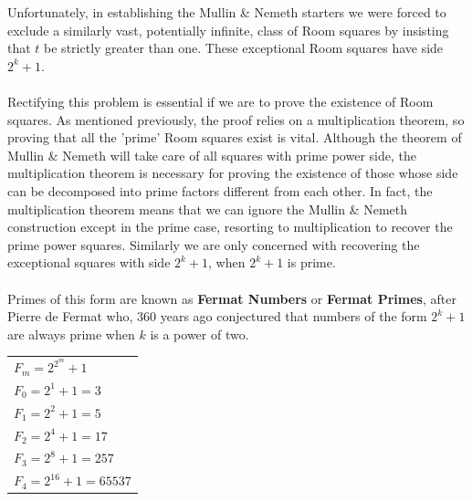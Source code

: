 \documentclass[
  12pt,
  a4paper]{book}
\begin{document}
Unfortunately, in establishing the Mullin \& Nemeth starters we were
forced to exclude a similarly vast, potentially infinite, class of Room
squares by insisting that \(t\) be strictly greater than one. These
exceptional Room squares have side \(2^k+1\).\\
~\\
Rectifying this problem is essential if we are to prove the existence of
Room squares. As mentioned previously, the proof relies on a
multiplication theorem, so proving that all the 'prime' Room squares
exist is vital. Although the theorem of Mullin \& Nemeth will take care
of all squares with prime power side, the multiplication theorem is
necessary for proving the existence of those whose side can be
decomposed into prime factors different from each other. In fact, the
multiplication theorem means that we can ignore the Mullin \& Nemeth
construction except in the prime case, resorting to multiplication to
recover the prime power squares. Similarly we are only concerned with
recovering the exceptional squares with side \(2^k+1\), when \(2^k+1\) is
prime.\\
~\\
Primes of this form are known as \textbf{Fermat Numbers} or \textbf{Fermat
Primes}, after Pierre de Fermat who, 360 years ago conjectured that
numbers of the form \(2^k+1\) are always prime when \(k\) is a power of two.

\begin{longtable}[]{@{}l@{}}
\toprule
\endhead
\(F_m=2^{2^m}+1\)\tabularnewline
\(F_0=2^1+1=3\)\tabularnewline
\(F_1=2^2+1=5\)\tabularnewline
\(F_2=2^4+1=17\)\tabularnewline
\(F_3=2^8+1=257\)\tabularnewline
\(F_4=2^{16}+1=65537\)\tabularnewline
\bottomrule
\end{longtable}
\end{document}
